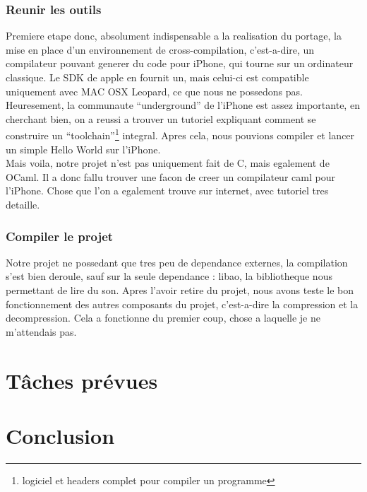 \documentclass[a4paper,12pt]{article}
\begin{document}
		\subsubsection{Reunir les outils}
Premiere etape donc, absolument indispensable a la realisation du
portage, la mise en place d'un environnement de cross-compilation,
c'est-a-dire, un compilateur pouvant generer du code pour iPhone, qui
tourne sur un ordinateur classique. Le SDK de apple en fournit un, mais
celui-ci est compatible uniquement avec MAC OSX Leopard, ce que nous ne
possedons pas. Heuresement, la communaute ``underground'' de l'iPhone
est assez importante, en cherchant bien, on a reussi a trouver un
tutoriel expliquant comment se construire un
``toolchain''\footnote{logiciel et headers complet pour compiler un
programme} integral. Apres cela, nous pouvions compiler et lancer un
simple Hello World sur l'iPhone.\\
Mais voila, notre projet n'est pas uniquement fait de C, mais egalement
de OCaml. Il a donc fallu trouver une facon de creer un compilateur caml
pour l'iPhone. Chose que l'on a egalement trouve sur internet, avec
tutoriel tres detaille.
		\subsubsection{Compiler le projet}
Notre projet ne possedant que tres peu de dependance externes, la
compilation s'est bien deroule, sauf sur la seule dependance : libao, la
bibliotheque nous permettant de lire du son. Apres l'avoir retire du
projet, nous avons teste le bon fonctionnement des autres composants du
projet, c'est-a-dire la compression et la decompression. Cela a
fonctionne du premier coup, chose a laquelle je ne m'attendais pas.\\

\newpage

\section{Tâches prévues}

\newpage

\section*{Conclusion}
\end{document}

